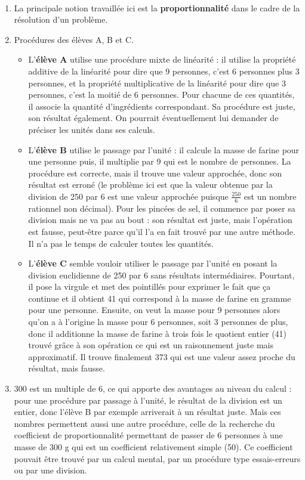 \ \\ [-5mm]
\begin{enumerate}
   \item La principale notion travaillée ici est la \textbf{proportionnalité} dans le cadre de la résolution d'un problème.
   \item Procédures des élèves A, B et C.
   \begin{itemize}
      \item L'\textbf{élève A} utilise une procédure mixte de linéarité : il utilise la propriété additive de la linéarité pour dire que 9 personnes, c'est 6 personnes plus 3 personnes, et la propriété multiplicative de la linéarité pour dire que 3 personnes, c'est la moitié de 6 personnes. Pour chacune de ces quantités, il associe la quantité d'ingrédients correspondant. Sa procédure est juste, son résultat également. On pourrait éventuellement lui demander de préciser les unités dans ses calculs.
      \item L'\textbf{élève B} utilise le passage par l'unité : il calcule la masse de farine pour une personne puis, il multiplie par 9 qui est le nombre de personnes. La procédure est correcte, mais il trouve une valeur approchée, donc son résultat est erroné (le problème ici est que la valeur obtenue par la division de 250 par 6 est une valeur approchée puisque $\frac{250}{6}$ est un nombre rationnel non décimal). Pour les pincées de sel, il commence par poser sa division mais ne va pas au bout : son résultat est juste, mais l'opération est fausse, peut-être parce qu'il l'a en fait trouvé par une autre méthode. Il n'a pas le temps de calculer toutes les quantités.
      \item L'\textbf{élève C} semble vouloir utiliser le passage par l'unité en posant la division euclidienne de 250 par 6 sans résultats intermédiaires. Pourtant, il pose la virgule et met des pointillés pour exprimer le fait que \og ça continue \fg{} et il obtient 41 qui correspond à la masse de farine en gramme pour une personne. Ensuite, on veut la masse pour 9 personnes alors qu'on a à l'origine la masse pour 6 personnes, soit 3 personnes de plus, donc il additionne la masse de farine à trois fois le quotient entier (41) trouvé grâce à son opération ce qui est un raisonnement juste mais approximatif. Il trouve finalement 373 qui est une valeur assez proche du résultat, mais fausse.
   \end{itemize}
   \item 300 est un multiple de 6, ce qui apporte des avantages au niveau du calcul : pour une procédure par passage à l'unité, le résultat de la division est un entier, donc l'élève B par exemple arriverait à un résultat juste. Mais ces nombres permettent aussi une autre procédure, celle de la recherche du coefficient de proportionnalité permettant de passer de 6 personnes à une masse de 300 g qui est un coefficient relativement simple (50). Ce coefficient pouvait être trouvé par un calcul mental, par un procédure type essais-erreurs ou par une division.
\end{enumerate}
